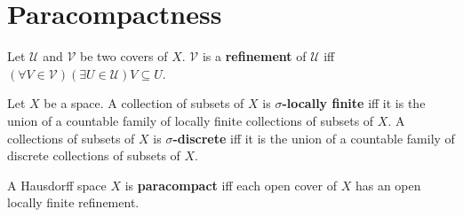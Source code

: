 \documentclass[12pt]{book}
\begin{document}
\section{Paracompactness}

\begin{definition}
	Let $\mathcal U$ and $\mathcal V$ be two covers of $X$. $\mathcal V$ is a {\bf refinement} of $\mathcal U$ iff $(\forall V\in \mathcal V)(\exists U\in\mathcal U)V\subseteq U$.
\end{definition}

\begin{definition}
	Let $X$ be a space. A collection of subsets of $X$ is {\bf $\sigma$-locally finite} iff it is the union of a countable family of locally finite collections of subsets of $X$. A collections of subsets of $X$ is {\bf $\sigma$-discrete} iff it is the union of a countable family of discrete collections of subsets of $X$.
\end{definition}

\begin{definition}
	A Hausdorff space $X$ is {\bf paracompact} iff each open cover of $X$ has an open locally finite refinement.
\end{definition}
\end{document}
